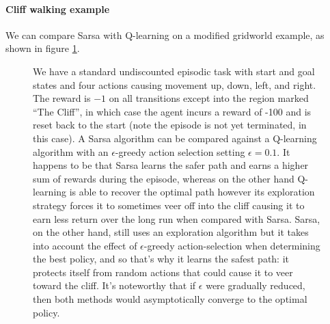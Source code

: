 \documentclass[12pt]{article}
\begin{document}
\paragraph{Cliff walking example} We can compare Sarsa with Q-learning on a modified gridworld example, as shown in figure \ref{fig: cliffgridworld}.

\begin{figure}[h]
  \centering
\caption{\footnotesize We have a standard undiscounted episodic task with start and goal states and four actions causing movement up, down, left, and right. The reward is $-1$ on all transitions except into the region marked ``The Cliff'', in which case the agent incurs a reward of -100 and is reset back to the start (note the episode is not yet terminated, in this case). A Sarsa algorithm can be compared against a Q-learning algorithm with an $\epsilon$-greedy action selection setting $\epsilon=0.1$. It happens to be that Sarsa learns the safer path and earns a higher sum of rewards during the episode, whereas on the other hand Q-learning is able to recover the optimal path however its exploration strategy forces it to sometimes veer off into the cliff causing it to earn less return over the long run when compared with Sarsa. Sarsa, on the other hand, still uses an exploration algorithm but it takes into account the effect of $\epsilon$-greedy action-selection when determining the best policy, and so that's why it learns the safest path: it protects itself from random actions that could cause it to veer toward the cliff. It's noteworthy that if $\epsilon$ were gradually reduced, then both methods would asymptotically converge to the optimal policy.}
\label{fig: cliffgridworld}
\end{figure}
\end{document}
